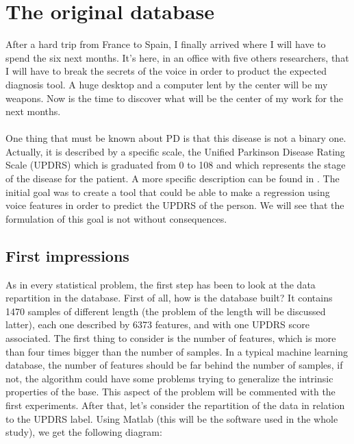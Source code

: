 \documentclass{report}
\begin{document}
	\chapter{The original database}
	
	After a hard trip from France to Spain, I finally arrived where I will have to spend the six next months. It's here, in an office with five others researchers, that I will have to break the secrets of the voice in order to product the expected diagnosis tool. A huge desktop and a computer lent by the center will be my weapons. Now is the time to discover what will be the center of my work for the next months.\\\\
	One thing that must be known about PD is that this disease is not a binary one. Actually, it is described by a specific scale, the Unified Parkinson Disease Rating Scale (UPDRS) which is graduated from 0 to 108 and which represents the stage of the disease for the patient. A more specific description can be found in \cite{movement2003unified}. The initial goal was to create a tool that could be able to make a regression using voice features in order to predict the UPDRS of the person. We will see that the formulation of this goal is not without consequences.
	
		\section{First impressions}
		
		As in every statistical problem, the first step has been to look at the data repartition in the database. First of all, how is the database built? It contains 1470 samples of different length (the problem of the length will be discussed latter), each one described by 6373 features, and with one UPDRS score associated. The first thing to consider is the number of features, which is more than four times bigger than the number of samples. In a typical machine learning database, the number of features should be far behind the number of samples, if not, the algorithm could have some problems trying to generalize the intrinsic properties of the base. This aspect of the problem will be commented with the first experiments.
		After that, let's consider the repartition of the data in relation to the UPDRS label. Using Matlab (this will be the software used in the whole study), we get the following diagram:
		
		
\end{document}
